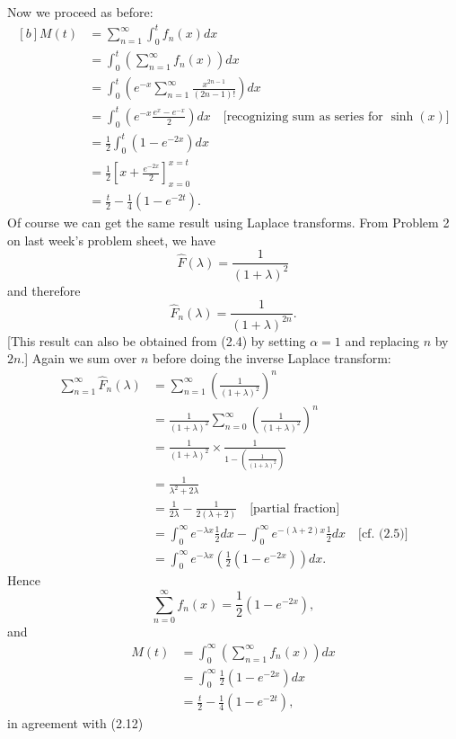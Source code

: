 \documentclass[11pt,a4paper]{article}
\begin{document}
\begin{enumerate}
    Now we proceed as before:
    \begin{equation}\tag{2.12}
      \begin{aligned}[b]
        M(t)
        &= \sum_{n = 1}^\infty \int_0^tf_n(x)dx\\
        &= \int_0^t \left(\sum_{n = 1}^\infty f_n(x)\right)dx\\
        &= \int_0^t \left(e^{-x}\sum_{n = 1}^\infty \frac{x^{2n - 1}}{(2n - 1)!}\right)dx\\
        &= \int_0^t\left(e^{-x}\frac{e^x - e^{-x}}{2}\right)dx\quad \text{[recognizing sum as series for $\sinh(x)$]}\\
        &= \frac{1}{2}\int_0^t(1 - e^{-2x})dx\\
        &= \frac{1}{2}\left[x + \frac{e^{-2x}}{2}\right]_{x = 0}^{x = t}\\
        &= \frac{t}{2} - \frac{1}{4}(1 - e^{-2t}). 
      \end{aligned}
    \end{equation}
    Of course we can get the same result using Laplace transforms. From Problem 2 on last week's problem sheet, we have
    $$
    \hat{F}(\lambda) = \frac{1}{(1 + \lambda)^2}
    $$
    and therefore
    $$
    \hat{F}_n(\lambda) = \frac{1}{(1 + \lambda)^{2n}}.
    $$
    [This result can also be obtained from (2.4) by setting $\alpha = 1$ and replacing $n$ by $2n$.] Again we sum over $n$ before doing the inverse Laplace transform:
    \begin{align*}
      \sum_{n = 1}^\infty \hat{F}_n(\lambda)
      &= \sum_{n = 1}^\infty\left(\frac{1}{(1 + \lambda)^2}\right)^n\\
      &= \frac{1}{(1 + \lambda)^2}\sum_{n = 0}^\infty\left(\frac{1}{(1 + \lambda)^2}\right)^n\\
      &= \frac{1}{(1 + \lambda)^2}\times \frac{1}{1 - \left(\frac{1}{(1 + \lambda)^2}\right)}\\
      &= \frac{1}{\lambda^2 + 2\lambda}\\
      &= \frac{1}{2\lambda} - \frac{1}{2(\lambda + 2)}\quad\text{[partial fraction]}\\
      &= \int_0^\infty e^{-\lambda x}\frac{1}{2}dx - \int_0^\infty e^{-(\lambda + 2)x}\frac{1}{2}dx\quad \text{[cf. (2.5)]}\\
      &= \int_0^\infty e^{-\lambda x}\left(\frac{1}{2}(1 - e^{-2x})\right)dx.
    \end{align*}
    Hence
    $$
    \sum_{n = 0}^\infty f_n(x) = \frac{1}{2}(1 - e^{-2x}),
    $$
    and
    \begin{align*}
      M(t)
      &= \int_0^\infty\left(\sum_{n = 1}^\infty f_n(x)\right)dx\\
      &= \int_0^\infty \frac{1}{2}(1 - e^{-2x})dx\\
      &= \frac{t}{2} - \frac{1}{4}(1 - e^{-2t}),
    \end{align*}
    in agreement with (2.12)
  \end{enumerate}
\end{document}
